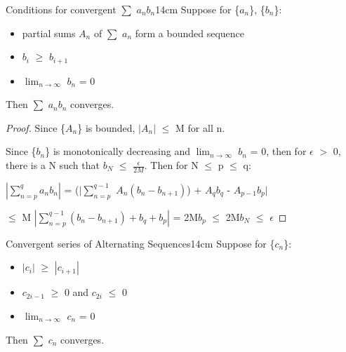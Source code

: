     \vspace{0.5cm}



    \begin{wtheorem}{Conditions for convergent $\sum$ $a_n b_n$}{14cm}
        Suppose for \{$a_n$\}, \{$b_n$\}:

        \begin{itemize}[leftmargin=1cm, itemsep=0.1cm]
            \item partial sums $A_n$ of $\sum$ $a_n$ form a bounded sequence
            
            \item $b_i$ $\geq$ $b_{i+1}$
            
            \item $\lim_{n \rightarrow \infty}$ $b_n$ = 0
        \end{itemize}

        Then $\sum$ $a_n b_n$ converges.
    \end{wtheorem}

    \begin{proof}
        Since \{$A_n$\} is bounded, $|A_n|$ $\leq$ M for all n.

        Since \{$b_n$\} is monotonically decreasing and
        $\lim_{n \rightarrow \infty}$ $b_n$ = 0, then
        for $\epsilon$ $>$ 0, there is a N such that
        $b_N$ $\leq$ $\frac{\epsilon}{2M}$.
        Then for N $\leq$ p $\leq$ q:

        \hspace{1cm}
        $| \sum_{n=p}^q a_n b_n |$
        = ($| \sum_{n = p}^{q-1}$ $A_n (b_n - b_{n+1})$)
        + $A_q b_q$ - $A_{p-1} b_p |$

        \hspace{3.3cm}
        $\leq$ M $| \sum_{n = p}^{q-1} (b_n - b_{n+1}) + b_q + b_p |$
        = 2M$b_p$
        $\leq$ 2M$b_N$
        $\leq$ $\epsilon$
    \end{proof}

    \newpage



    \begin{corollary}{Convergent series of Alternating Sequences}{14cm}
        Suppose for \{$c_n$\}:

        \begin{itemize}[leftmargin=1cm, itemsep=0.1cm]
            \item $|c_i|$ $\geq$ $|c_{i+1}|$
            
            \item $c_{2i-1}$ $\geq$ 0 and $c_{2i}$ $\leq$ 0
            
            \item $\lim_{n \rightarrow \infty}$ $c_n$ = 0
        \end{itemize}

        Then $\sum$ $c_n$ converges.
    \end{corollary}

